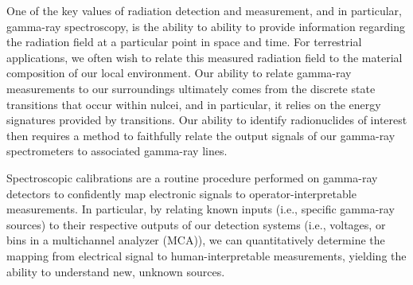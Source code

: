 One of the key values of radiation detection and measurement, and in particular,
gamma-ray spectroscopy, is the ability to ability to provide information regarding
the radiation field at a particular point in space and time. For terrestrial
applications, we often wish to relate this measured radiation field to the material
composition of our local environment. Our ability to relate gamma-ray measurements
to our surroundings ultimately comes from the discrete state transitions that occur within
nulcei, and in particular, it relies on the energy signatures provided by transitions.
Our ability to identify radionuclides of interest then requires a method to faithfully relate the
output signals of our gamma-ray spectrometers to associated gamma-ray lines.


Spectroscopic calibrations are a routine procedure performed on gamma-ray detectors
to confidently map electronic signals to operator-interpretable
measurements. In particular, by relating known inputs (i.e., specific gamma-ray sources)
to their respective outputs of our detection systems (i.e., voltages, or bins in a multichannel analyzer (MCA)),
we can quantitatively determine the
mapping from electrical signal to human-interpretable measurements, yielding
the ability to understand new, unknown sources.
